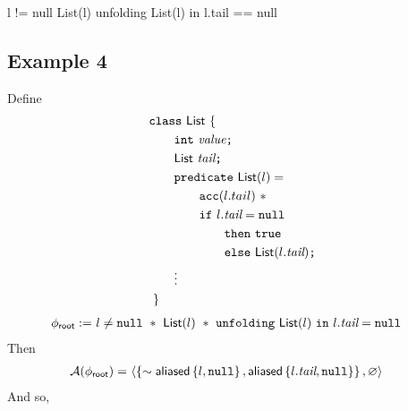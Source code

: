 %
l != null List(l) unfolding List(l) in l.tail == null

\newpage
\subsection*{Example 4}

\renewcommand{\int}{\ttt{int}}
\newcommand{\IntList}{\tsf{IntList}}
\newcommand{\List}{\tsf{List}}
\newcommand{\vvalue}{\tit{value}}
\newcommand{\vtail}{\tit{tail}}
\newcommand{\ctrue}{\ttt{true}}

Define
\begin{align*}
&\hspace{0em} \ttt{class} \ \List \ \{ \\
&\hspace{2em}   \int \ \vvalue \ttt{;} \\
&\hspace{2em}   \List \ \vtail \ttt{;} \\
&\hspace{2em}   \ttt{predicate} \ \List(l) = \\
&\hspace{4em}     \cacc(l.tail) \ \ast \\
&\hspace{4em}     \cif \ l.\vtail = \cnull \\
&\hspace{6em}       \cthen \ \ctrue \\
&\hspace{6em}       \celse \ \List(l.\vtail)
                \ttt{;} \\
&\hspace{2em} \vdots \\
&\hspace{0em} \ \}
\end{align*}
%
\begin{align*}
\phiroot := & \
l \neq \cnull \ \ast \
\List(l) \ \ast \
\cunfolding \ \List(l) \ \cin \ l.\vtail = \cnull
\end{align*}
Then
\begin{align*}
\A(\phiroot) = & \
\context
  { \set{ \pnot \aliased\set{l, \cnull}, \aliased\set{l.\vtail, \cnull} } }
  { \empty }
\end{align*}
And so,
